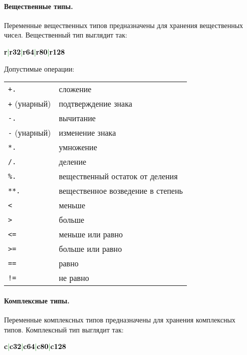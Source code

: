 \documentclass[10pt]{report}
\begin{document}
            \paragraph{Вещественные типы.}Переменные вещественных типов предназначены для хранения вещественных чисел. Вещественный тип выглядит так:
\begin{center}
\noindent\textcolor{Green}{\textcolor{Black}{\textbf{r}}|\textcolor{Black}{\textbf{r32}}|\textcolor{Black}{\textbf{r64}}|\textcolor{Black}{\textbf{r80}}|\textcolor{Black}{\textbf{r128}}}
\end{center}

Допустимые операции:
\begin{longtable}{ll}
\texttt{+.}             & сложение                                          \\
\texttt{+} (унарный)    & подтверждение знака                               \\
\texttt{-.}             & вычитание                                         \\
\texttt{-} (унарный)    & изменение знака                                   \\
\texttt{*.}             & умножение                                         \\
\texttt{/.}             & деление                                           \\
\texttt{\%.}            & вещественный остаток от деления                   \\
\texttt{**.}            & вещественное возведение в степень                 \\
\texttt{<}              & меньше                                            \\
\texttt{>}              & больше                                            \\
\texttt{<=}             & меньше или равно                                  \\
\texttt{>=}             & больше или равно                                  \\
\texttt{==}             & равно                                             \\
\texttt{!=}             & не равно                                          \\
\end{longtable}

            \paragraph{Комплексные типы.}Переменные комплексных типов предназначены для хранения комплексных типов. Комплексный тип выглядит так:
\begin{center}
\noindent\textcolor{Green}{\textcolor{Black}{\textbf{c}}|\textcolor{Black}{\textbf{c32}}|\textcolor{Black}{\textbf{c64}}|\textcolor{Black}{\textbf{c80}}|\textcolor{Black}{\textbf{c128}}}
\end{center}
\end{document}
